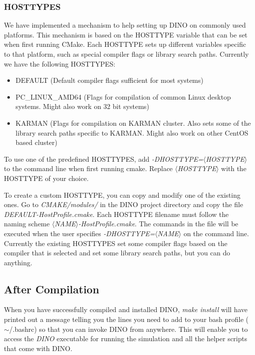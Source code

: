 \subsubsection{HOSTTYPES}
We have implemented a mechanism to help setting up DINO on commonly used platforms. This mechanism is based on the HOSTTYPE variable that can be set when first running CMake. Each HOSTTYPE sets up different variables specific to that platform, such as special compiler flags or library search paths. Currently we have the following HOSTTYPES:
\begin{itemize}
  \item DEFAULT (Default compiler flags sufficient for most systems)
  \item PC\_LINUX\_AMD64 (Flags for compilation of common Linux desktop systems. Might also work on 32 bit systems)
  \item KARMAN (Flags for compilation on KARMAN cluster. Also sets some of the library search paths specific to KARMAN. Might also work on other CentOS based cluster)
\end{itemize}
To use one of the predefined HOSTTYPES, add \textit{-DHOSTTYPE=$\langle$HOSTTYPE$\rangle$} to the command line when first running cmake. Replace \textit{$\langle$HOSTTYPE$\rangle$} with the HOSTTYPE of your choice.

To create a custom HOSTTYPE, you can copy and modify one of the existing ones. Go to \textit{CMAKE/modules/} in the DINO project directory and copy the file \textit{DEFAULT-HostProfile.cmake}. Each HOSTTYPE filename must follow the naming scheme \textit{$\langle$NAME$\rangle$-HostProfile.cmake}. The commands in the file will be executed when the user specifies \textit{-DHOSTTYPE=$\langle$NAME$\rangle$} on the command line. Currently the existing HOSTTYPES set some compiler flags based on the compiler that is selected and set some library search paths, but you can do anything.

\subsection{After Compilation}
When you have successfully compiled and installed DINO, \textit{make install} will have printed out a message telling you the lines you need to add to your bash profile ($\sim$/.bashrc) so that you can invoke DINO from anywhere. This will enable you to access the \textit{DINO} executable for running the simulation and all the helper scripts that come with DINO.
